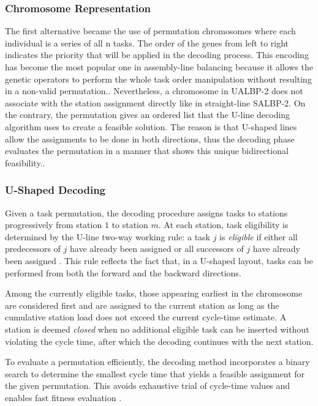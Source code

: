 \documentclass[12pt,a4paper]{article}
\begin{document}
\subsubsection{Chromosome Representation}
The first alternative became the use of permutation chromosomes where each individual is a series of all n tasks. The order of the genes from left to right indicates the priority that will be applied in the decoding process. This encoding has become the most popular one in assembly-line balancing because it allows the genetic operators to perform the whole task order manipulation without resulting in a non-valid permutation.\cite{GhoshGagne2011}.
Nevertheless, a chromosome in UALBP-2 does not associate with the station assignment directly like in straight-line SALBP-2. On the contrary, the permutation gives an ordered list that the U-line decoding algorithm uses to create a feasible solution. The reason is that U-shaped lines allow the assignments to be done in both directions, thus the decoding phase evaluates the permutation in a manner that shows this unique bidirectional feasibility.\cite{GhoshGagne2011}. 


\subsubsection{U-Shaped Decoding}

Given a task permutation, the decoding procedure assigns tasks to stations progressively from station $1$ to station $m$. At each station, task eligibility is determined by the U-line two-way working rule: a task $j$ is \emph{eligible} if either all predecessors of $j$ have already been assigned or all successors of $j$ have already been assigned \cite{KaraIslierAtasagun2010}. This rule reflects the fact that, in a U-shaped layout, tasks can be performed from both the forward and the backward directions.

Among the currently eligible tasks, those appearing earliest in the chromosome are considered first and are assigned to the current station as long as the cumulative station load does not exceed the current cycle-time estimate. A station is deemed \emph{closed} when no additional eligible task can be inserted without violating the cycle time, after which the decoding continues with the next station.

To evaluate a permutation efficiently, the decoding method incorporates a binary search to determine the smallest cycle time that yields a feasible assignment for the given permutation. This avoids exhaustive trial of cycle-time values and enables fast fitness evaluation \cite{scholl_klein_1999}.
\end{document}
